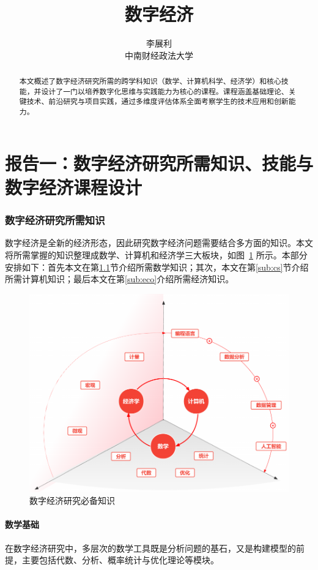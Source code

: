 \documentclass[lang=cn,12pt,a4paper]{elegantpaper}
\title{数字经济}
\author{李展利 \\  中南财经政法大学}
\institute{\href{https://elegantlatex.org/}{Elegant\LaTeX{} 项目组}}
\date{}
\begin{document}

\newpage

\tableofcontents
\newpage  %
\part{报告一：数字经济研究所需知识、技能与数字经济课程设计}
\begin{abstract}
本文概述了数字经济研究所需的跨学科知识（数学、计算机科学、经济学）和核心技能，并设计了一门以培养数字化思维与实践能力为核心的课程。课程涵盖基础理论、关键技术、前沿研究与项目实践，通过多维度评估体系全面考察学生的技术应用和创新能力。
\end{abstract}
\section{数字经济研究所需知识}
数字经济是全新的经济形态，因此研究数字经济问题需要结合多方面的知识。本文将所需掌握的知识整理成数学、计算机和经济学三大板块，如图~\ref{fig:eco_founda} 所示。本部分安排如下：首先本文在第\ref{sub:math}节介绍所需数学知识；其次，本文在第\ref{sub:cs}节介绍所需计算机知识；最后本文在第\ref{sub:eco}介绍所需经济知识。
\begin{figure}[H]
    \centering
    \includegraphics[width=0.86\linewidth]{intro.png}
    \caption{数字经济研究必备知识}
    \label{fig:eco_founda}
\end{figure}
\subsection{数学基础}
\label{sub:math}
在数字经济研究中，多层次的数学工具既是分析问题的基石，又是构建模型的前提，主要包括代数、分析、概率统计与优化理论等模块。
\end{document}

